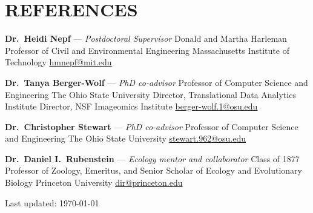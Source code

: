 \clearpage
\section{REFERENCES}


\newcommand{\refgap}{\vspace{7pt}}

\noindent\textbf{Dr.~Heidi Nepf} --- \textit{Postdoctoral Supervisor} \newline
Donald and Martha Harleman Professor of Civil and Environmental Engineering\newline
Massachusetts Institute of Technology \newline
\href{mailto:hmnepf@mit.edu}{hmnepf@mit.edu}
\refgap

\noindent\textbf{Dr.~Tanya Berger-Wolf} --- \textit{PhD co-advisor} \newline
Professor of Computer Science and Engineering\newline
The Ohio State University \newline
Director, Translational Data Analytics Institute \newline
Director, NSF Imageomics Institute \newline
\href{mailto:berger-wolf.1@osu.edu}{berger-wolf.1@osu.edu}
\refgap

\noindent\textbf{Dr.~Christopher Stewart} --- \textit{PhD co-advisor} \newline
Professor of Computer Science and Engineering \newline
The Ohio State University \newline
\href{mailto:stewart.962@osu.edu}{stewart.962@osu.edu}
\refgap

\noindent\textbf{Dr.~Daniel I.~Rubenstein} --- \textit{Ecology mentor and collaborator} \newline
Class of 1877 Professor of Zoology, Emeritus, and Senior Scholar of Ecology and Evolutionary Biology\newline
 Princeton University \newline
\href{mailto:dir@princeton.edu}{dir@princeton.edu}
\refgap



\nopagebreak
{}
\vspace{20pt}
\centerline{\footnotesize Last updated: \today}

